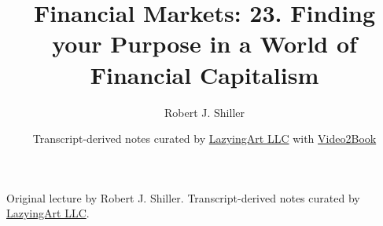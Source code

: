 \documentclass[11pt,oneside]{book}
\begin{document}
\frontmatter
\title{Financial Markets: 23. Finding your Purpose in a World of Financial Capitalism}
\author{Robert J. Shiller}
\date{Transcript-derived notes curated by \href{https://lazying.art}{LazyingArt LLC} with \href{https://github.com/lachlanchen/Video2Book}{Video2Book}}
\maketitle
\begin{center}
\small Original lecture by Robert J. Shiller. Transcript-derived notes curated by \href{https://lazying.art}{LazyingArt LLC}.
\end{center}
\clearpage
\mainmatter

\end{document}

